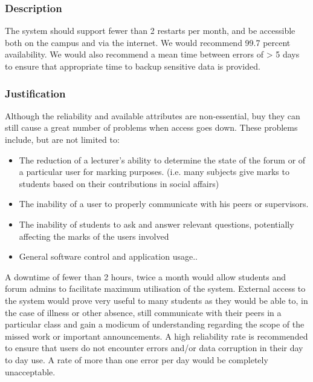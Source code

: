 
	\subsubsection*{Description}
		The system should support fewer than 2 restarts per month, and be accessible both on the campus and via the internet. We would recommend 99.7 percent availability. We would also recommend a mean time between errors of > 5 days to ensure that appropriate time to backup sensitive data is provided.
	\subsubsection*{Justification}
	Although the reliability and available attributes are non-essential, buy they can still cause a great number of problems when access goes down. These problems include, but are not limited to: 
	
				
					\begin{itemize}
							\item The reduction of a lecturer’s ability to determine the state of the forum or of a particular user for marking purposes. (i.e. many subjects give marks to students based on their contributions in social affairs)
							
							\item The inability of a user to properly communicate with his peers or supervisors.
							
							\item The inability of students to ask and answer relevant questions, potentially affecting the marks of the users involved
							
							\item General software control and application usage..
						 \end{itemize}
						 
	A downtime of fewer than 2 hours, twice a month would allow students and forum admins to facilitate maximum utilisation of the system.
	External access to the system would prove very useful to many students as they would be able to, in the case of illness or other absence, still communicate with their peers in a particular class and gain a modicum of understanding regarding the scope of the missed work or important announcements.
	A high reliability rate is recommended to ensure that users do not encounter errors and/or data corruption in their day to day use. A rate of more than one error per day would be completely unacceptable.
		
	
	
